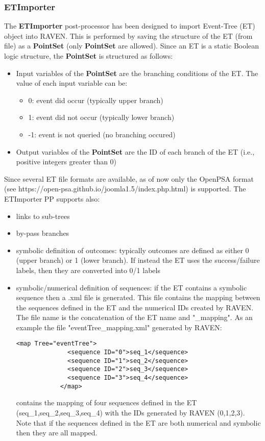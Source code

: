 
\subsubsection{ETImporter}
\label{ETImporterPP}
The \textbf{ETImporter} post-processor has been designed to import Event-Tree (ET) object into
RAVEN. This is performed by saving the structure of the ET (from file) as a \textbf{PointSet} (only \textbf{PointSet} are allowed). 
Since an ET is a static Boolean logic structure, the \textbf{PointSet} is structured as follows:
\begin{itemize}
  \item Input variables of the \textbf{PointSet} are the branching conditions of the ET. The value of each input variable can be:
  \begin{itemize}
    \item  0: event did occur (typically upper branch)
    \item  1: event did not occur (typically lower branch)
    \item -1: event is not queried (no branching occured)
  \end{itemize}   
  \item Output variables of the \textbf{PointSet} are the ID of each branch of the ET (i.e., positive integers greater than 0)
\end{itemize}
Since several ET file formats are available, as of now only the OpenPSA format (see https://open-psa.github.io/joomla1.5/index.php.html) is supported.
The ETImporter PP supports also:
\begin{itemize}
  \item links to sub-trees
  \item by-pass branches
  \item symbolic definition of outcomes: typically outcomes are defined as either 0 (upper branch) or 1 (lower branch). If instead the ET uses the
        success/failure labels, then they are converted into 0/1 labels
  \item symbolic/numerical definition of sequences: if the ET contains a symbolic sequence then a .xml file is generated.  This file contains
        the mapping between the sequences defined in the ET and the numerical IDs created by RAVEN. The file name is the concatenation of the ET name
        and "\_mapping". As an example the file "eventTree\_mapping.xml" generated by RAVEN:
        \begin{lstlisting}[style=XML]
            <map Tree="eventTree">
              <sequence ID="0">seq_1</sequence>
              <sequence ID="1">seq_2</sequence>
              <sequence ID="2">seq_3</sequence>
              <sequence ID="3">seq_4</sequence>
            </map>
        \end{lstlisting}
        contains the mapping of four sequences defined in the ET (seq\_1,seq\_2,seq\_3,seq\_4) with the IDs generated by RAVEN (0,1,2,3).
        Note that if the sequences defined in the ET are both numerical and symbolic then they are all mapped.
\end{itemize}
